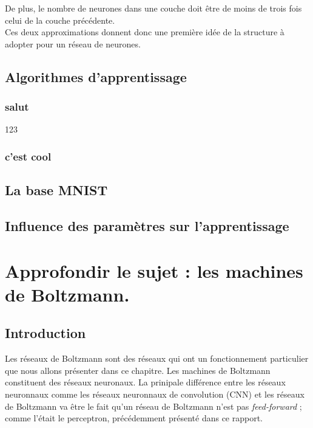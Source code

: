 \documentclass[a4paper,twoside]{report}
\begin{document}
                De plus, le nombre de neurones dans une couche doit être de moins de trois fois celui de la couche précédente.\\

                Ces deux approximations donnent donc une première idée de la structure à  adopter pour un réseau de neurones.



        \chapter{Algorithmes d'apprentissage}

            \section{salut}

                123


            \section{c'est cool}


        \chapter{La base MNIST}

        \chapter{Influence des paramètres sur l'apprentissage}




    \part[Machines de Boltzmann]{Approfondir le sujet : les machines de Boltzmann.}

        \chapter{Introduction}

            Les réseaux de Boltzmann sont des réseaux qui ont un fonctionnement
            particulier que nous allons présenter dans ce chapitre. Les machines de
            Boltzmann constituent des réseaux neuronaux. La prinipale différence entre
            les réseaux neuronnaux comme les réseaux neuronnaux de convolution (CNN) et
            les  réseaux de Boltzmann va être le fait qu'un réseau de Boltzmann n'est
            pas \textit{feed-forward} ; comme l'était le perceptron, précédemment présenté dans ce
            rapport.
\end{document}
